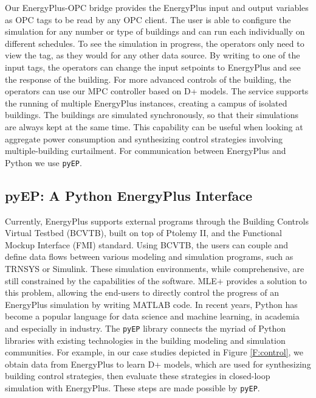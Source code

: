 Our EnergyPlus-OPC bridge provides the EnergyPlus input and output variables as OPC tags to be read by any OPC client.
The user is able to configure the simulation for any number or type of buildings and can run each individually on different schedules.
To see the simulation in progress, the operators only need to view the tag, as they would for any other data source.
By writing to one of the input tags, the operators can change the input setpoints to EnergyPlus and see the response of the building.
For more advanced controls of the building, the operators can use our MPC controller based on D+ models.
The service supports the running of multiple EnergyPlus instances, creating a campus of isolated buildings.
The buildings are simulated synchronously, so that their simulations are always kept at the same time. %
This capability can be useful when looking at aggregate power consumption and synthesizing control strategies involving multiple-building curtailment.
For communication between EnergyPlus and Python we use \texttt{pyEP}.

\subsection{pyEP: A Python EnergyPlus Interface}

Currently, EnergyPlus supports external programs through the Building Controls Virtual Testbed (BCVTB), built on top of Ptolemy II, and the Functional Mockup Interface (FMI) standard. 
Using BCVTB, the users can couple and define data flows between various modeling and simulation programs, such as TRNSYS or Simulink. 
These simulation environments, while comprehensive, are still constrained by the capabilities of the software. 
MLE+ provides a solution to this problem, allowing the end-users to directly control the progress of an EnergyPlus simulation by writing MATLAB code. 
In recent years, Python has become a popular language for data science and machine learning, in academia and especially in industry. %
The \texttt{pyEP} library connects the myriad of Python libraries with existing technologies in the building modeling and simulation communities.
For example, in our case studies depicted in Figure \ref{F:control}, we obtain data from EnergyPlus to learn D+ models, which are used for synthesizing building control strategies, then evaluate these strategies in closed-loop simulation with EnergyPlus.
These steps are made possible by \texttt{pyEP}.

